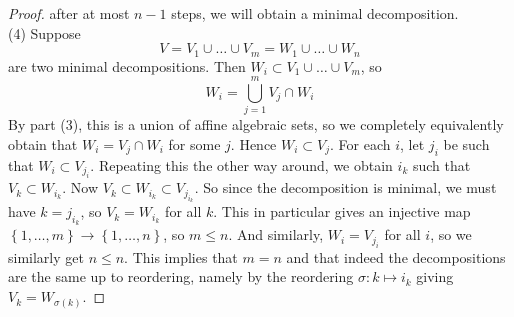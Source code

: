 \documentclass[reqno]{amsart}
\theoremstyle{definition}
\theoremstyle{remark}
\begin{document}
\begin{proof}
       after at most $n-1$ steps, we will obtain a minimal
       decomposition.\\
       \linebreak
       (4) Suppose
       \[
       V = V_1 \cup \ldots \cup  V_m = 
       W_1 \cup  \ldots \cup W_n
       \] 
       are two minimal decompositions.
       Then
       $W_i \subset 
       V_1 \cup  \ldots \cup V_m$, so
       \[
       W_i = \bigcup_{j=1}^{m} V_j \cap W_i
       \] 
       By part (3), this is a union of affine algebraic sets,
       so we completely equivalently obtain that
       $W_i = V_j \cap W_i$ for some $j$.
       Hence $W_i \subset V_j$.
       For each  $i$, let
       $j_i$ be such that
       $W_i \subset V_{j_i}$.
       Repeating this the other way around, we obtain
       $i_k$ such that
       $V_k \subset W_{i_k}$.
       Now
       $V_k \subset W_{i_k} \subset 
       V_{j_{i_k}}$. So since the decomposition is minimal,
       we must have
       $k = j_{i_{k}}$, so
       $V_k = W_{i_k}$ for all $k$.
       This in particular gives an injective map
       $\left\{ 1, \ldots,m \right\} \to 
       \left\{ 1, \ldots, n \right\} $, so
       $m\le n$.
       And similarly, $W_i = V_{j_i}$ for all
       $i$, so we similarly get $n\le n$.
       This implies that
       $m = n$ and that indeed the decompositions
       are the same up to reordering, namely by the reordering
       $\sigma \colon k \mapsto i_k$ giving
       $V_{k} = 
       W_{\sigma (k)}$.
    \end{proof}



\end{document}
